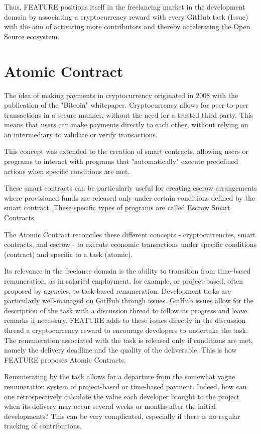 \documentclass[
	a4paper, %
	10pt, %
	unnumberedsections, %
	twoside, %
]{LTJournalArticle}
\begin{document}
Thus, FEATURE positions itself in the freelancing market in the development domain by associating a cryptocurrency reward with every GitHub task (Issue) with the aim of activating more contributors and thereby accelerating the Open Source ecosystem.


\section{Atomic Contract}

The idea of making payments in cryptocurrency originated in 2008 with the publication of the "Bitcoin" whitepaper. Cryptocurrency allows for peer-to-peer transactions in a secure manner, without the need for a trusted third party. This means that users can make payments directly to each other, without relying on an intermediary to validate or verify transactions.

This concept was extended to the creation of smart contracts, allowing users or programs to interact with programs that "automatically" execute predefined actions when specific conditions are met.

These smart contracts can be particularly useful for creating escrow arrangements where provisioned funds are released only under certain conditions defined by the smart contract. These specific types of programs are called Escrow Smart Contracts.

The Atomic Contract reconciles these different concepts - cryptocurrencies, smart contracts, and escrow - to execute economic transactions under specific conditions (contract) and specific to a task (atomic).

Its relevance in the freelance domain is the ability to transition from time-based remuneration, as in salaried employment, for example, or project-based, often proposed by agencies, to task-based remuneration. Development tasks are particularly well-managed on GitHub through issues. GitHub issues allow for the description of the task with a discussion thread to follow its progress and leave remarks if necessary. FEATURE adds to these issues directly in the discussion thread a cryptocurrency reward to encourage developers to undertake the task. The remuneration associated with the task is released only if conditions are met, namely the delivery deadline and the quality of the deliverable. This is how FEATURE proposes Atomic Contracts.

Remunerating by the task allows for a departure from the somewhat vague remuneration system of project-based or time-based payment. Indeed, how can one retrospectively calculate the value each developer brought to the project when its delivery may occur several weeks or months after the initial developments? This can be very complicated, especially if there is no regular tracking of contributions.
\end{document}
